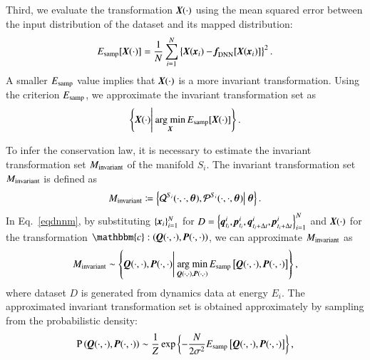 \documentclass[preprint,
bibnotes,
 amsmath,amssymb,
 aps,
]{revtex4-1}
\newcommand{\argmin}{\mathop{\rm arg~min}\limits}
\begin{document}
Third, we evaluate the transformation $\textit{\textbf{X}}(\cdot)$ using the mean squared error between the input distribution of the dataset and its mapped distribution: 
\begin{equation}
\label{eqdnnm}
E_{\rm samp}[\textit{\textbf{X}}(\cdot)] = \frac{1}{N}\sum_{i=1}^N \left\{ \textit{\textbf{X}}(\textit{\textbf{x}}_i) - \textit{\textbf{f}}_{\rm DNN}[\textit{\textbf{X}}(\textit{\textbf{x}}_i)]\right\}^2. 
\end{equation}
A smaller $E_{\rm samp}$ value implies that $\textit{\textbf{X}}(\cdot)$ is a more invariant transformation. 
Using the criterion $E_{\rm samp}$, we approximate the invariant transformation set as
\begin{eqnarray}
\left\{\textit{\textbf{X}}(\cdot) \middle|\: \argmin_{\textit{\textbf{X}}}  E_{\rm samp}[\textit{\textbf{X}}(\cdot)]\right\}.
\end{eqnarray}\par
To infer the conservation law, it is necessary to estimate the invariant transformation set $M_{{\rm invariant}}$ of the manifold $S_i$. 
The invariant transformation set $M_{{\rm invariant}}$ is defined as 
\begin{equation}
M_{{\rm invariant}} \coloneqq \left\{\mathbf{\mathcal{Q}}^{S_i}(\cdot,\cdot, \boldsymbol{\theta}),\mathbf{\mathcal{P}}^{S_i}(\cdot,\cdot, \boldsymbol{\theta}) \middle|\:\boldsymbol{\theta}\right\}. 
\end{equation}
In Eq.~\eqref{eqdnnm}, by substituting $ \{\textit{\textbf{x}}_i\}_{i=1}^N$ for  $D = \left\{\textit{\textbf{q}}_{t_i}^i, \textit{\textbf{p}}_{t_i}^i,\textit{\textbf{q}}_{t_i+\Delta t}^i, \textit{\textbf{p}}_{t_i+\Delta t}^i\right\}_{i=1}^N$ and $\textit{\textbf{X}}(\cdot)$ for the transformation $\mathbbm{c}: \left(\textit{\textbf{Q}}(\cdot,\cdot),\textit{\textbf{P}}(\cdot,\cdot)\right)$, 
we can approximate $M_{{\rm invariant}}$ as
\begin{eqnarray}
M_{{\rm invariant}} \sim   \left\{\textit{\textbf{Q}}(\cdot,\cdot),\textit{\textbf{P}}(\cdot,\cdot)\middle|\:\argmin_{\textit{\textbf{Q}}(\cdot,\cdot),\textit{\textbf{P}}(\cdot,\cdot)}  E_{\rm samp}\left[\textit{\textbf{Q}}(\cdot,\cdot),\textit{\textbf{P}}(\cdot,\cdot)\right]\right\},
\end{eqnarray}
where dataset $D$ is generated from dynamics data at energy $E_i$. 
The approximated invariant transformation set is obtained approximately by sampling from the probabilistic density:
\begin{eqnarray}
{\rm P}\left(\textit{\textbf{Q}}(\cdot,\cdot),\textit{\textbf{P}}(\cdot,\cdot)\right) \sim \frac{1}{Z}\exp\left\{-\frac{N}{2\sigma^2}E_{\rm samp}\left[\textit{\textbf{Q}}(\cdot,\cdot),\textit{\textbf{P}}(\cdot,\cdot)\right]\right\},
\end{eqnarray}
\end{document}
